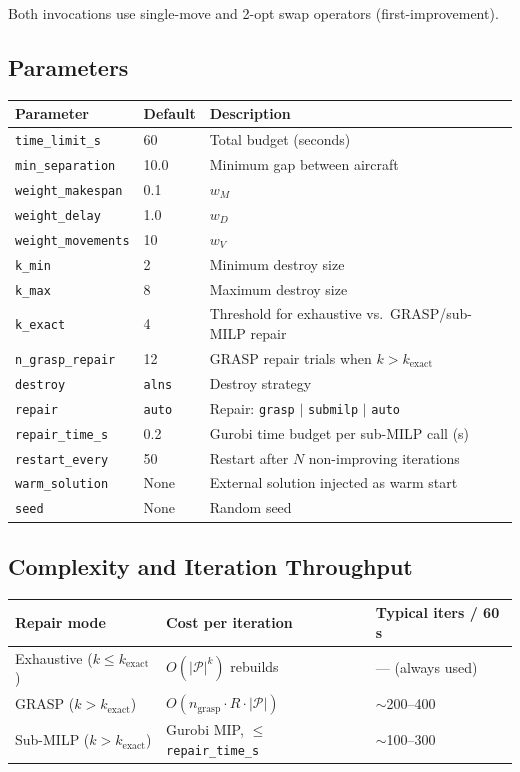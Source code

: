 Both invocations use single-move and 2-opt swap operators (first-improvement).

\subsection{Parameters}

\begin{center}
\begin{tabular}{lll}
\toprule
Parameter & Default & Description \\
\midrule
\texttt{time\_limit\_s} & 60 & Total budget (seconds) \\
\texttt{min\_separation} & 10.0 & Minimum gap between aircraft \\
\texttt{weight\_makespan} & 0.1 & $w_M$ \\
\texttt{weight\_delay} & 1.0 & $w_D$ \\
\texttt{weight\_movements} & 10 & $w_V$ \\
\texttt{k\_min} & 2 & Minimum destroy size \\
\texttt{k\_max} & 8 & Maximum destroy size \\
\texttt{k\_exact} & 4 & Threshold for exhaustive vs.\ GRASP/sub-MILP repair \\
\texttt{n\_grasp\_repair} & 12 & GRASP repair trials when $k > k_{\text{exact}}$ \\
\texttt{destroy} & \texttt{alns} & Destroy strategy \\
\texttt{repair} & \texttt{auto} & Repair: \texttt{grasp} $|$ \texttt{submilp} $|$ \texttt{auto} \\
\texttt{repair\_time\_s} & 0.2 & Gurobi time budget per sub-MILP call (s) \\
\texttt{restart\_every} & 50 & Restart after $N$ non-improving iterations \\
\texttt{warm\_solution} & None & External solution injected as warm start \\
\texttt{seed} & None & Random seed \\
\bottomrule
\end{tabular}
\end{center}

\subsection{Complexity and Iteration Throughput}

\begin{center}
\begin{tabular}{lll}
\toprule
Repair mode & Cost per iteration & Typical iters / 60\,s \\
\midrule
Exhaustive ($k \leq k_{\text{exact}}$) & $O(|\mathcal{P}|^k)$ rebuilds & — (always used) \\
GRASP ($k > k_{\text{exact}}$) & $O(n_{\text{grasp}} \cdot R \cdot |\mathcal{P}|)$ & $\sim$200–400 \\
Sub-MILP ($k > k_{\text{exact}}$) & Gurobi MIP, $\leq$ \texttt{repair\_time\_s} & $\sim$100–300 \\
\bottomrule
\end{tabular}
\end{center}
